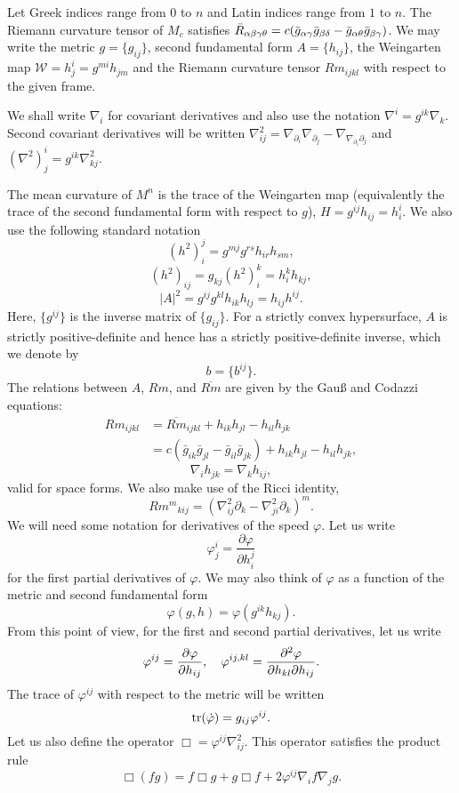 \documentclass{amsart}
\begin{document}
Let Greek indices range from \(0\) to \(n\) and Latin indices range from \(1\) to \(n\). The Riemann curvature tensor of \(M_c\) satisfies \(\bar{R}_{\alpha\beta\gamma\theta} = c(\bar{g}_{\alpha\gamma}\bar{g}_{\beta\delta} - \bar{g}_{\alpha\theta}\bar{g}_{\beta\gamma})\). We may write the metric $g = \{g_{ij}\}$, second fundamental form $A = \{h_{ij}\}$, the Weingarten map $\mathcal{W} = h^i_j = g^{mi} h_{jm}$ and the Riemann curvature tensor $Rm_{ijkl}$ with respect to the given frame.

We shall write \(\nabla_i\) for covariant derivatives and also use the notation \(\nabla^i = g^{ik} \nabla_k\). Second covariant derivatives will be written \(\nabla^2_{ij} = \nabla_{\partial_i} \nabla_{\partial_j} - \nabla_{\nabla_{\partial_i} \partial_j}\) and \((\nabla^2)^i_j = g^{ik} \nabla^2_{kj}\).

The mean curvature of $M^n$ is the trace of the Weingarten map (equivalently the trace of the second fundamental form with respect to $g$), $H = g^{ij}h_{ij} = h^i_i$. We also use the following standard notation
\[
(h^2)_i^j = g^{mj}g^{rs}h_{ir}h_{sm},
\]
\[
(h^2)_{ij} = g_{kj} (h^2)_i^k = h^k_i h_{kj},
\]
\[
|A|^2 = g^{ij}g^{kl}h_{ik}h_{lj} = h_{ij}h^{ij}.
\]
Here, $\{g^{ij}\}$ is the inverse matrix of $\{g_{ij}\}.$ For a strictly convex hypersurface, \(A\) is strictly positive-definite and hence has a strictly positive-definite inverse, which we denote by
\[
b = \{b^{ij}\}.
\]
The relations between $A$, $Rm$, and $\overline{Rm}$ are given by the Gau{\ss} and Codazzi equations:
\[
\begin{split}
Rm_{ijkl} &= \overline{Rm}_{ijkl} + h_{ik}h_{jl} - h_{il}h_{jk} \\
&= c(\bar{g}_{ik}\bar{g}_{jl} - \bar{g}_{il}\bar{g}_{jk}) + h_{ik}h_{jl} - h_{il}h_{jk},
\end{split}
\]
\[
\nabla_i h_{jk} = \nabla_k h_{ij},
\]
valid for space forms. We also make use of the Ricci identity,
\[
{Rm^m}_{kij}  = \left(\nabla^2_{ij} \partial_k - \nabla^2_{ji} \partial_k\right)^m.
\]
We will need some notation for derivatives of the speed \(\varphi\). Let us write
\[
\varphi^{i}_{j} = \frac{\partial \varphi}{\partial h^{j}_{i}}
\]
for the first partial derivatives of \(\varphi\). We may also think of \(\varphi\) as a function of the metric and second fundamental form
\[
\varphi(g, h) = \varphi(g^{ik} h_{kj}).
\]
From this point of view, for the first and second partial derivatives, let us write
\[
\varphi^{ij} = \frac{\partial\varphi}{\partial h_{ij}}, \quad \varphi^{ij,kl} = \frac{\partial^2\varphi}{\partial h_{kl} \partial h_{ij}}.
\]
The trace of \(\varphi^{ij}\) with respect to the metric will be written
\[
\operatorname{tr}(\dot{\varphi}) = g_{ij} \varphi^{ij}.
\]
Let us also define the operator
$
\Box = \varphi^{ij} \nabla^2_{ij}.
$
This operator satisfies the product rule
\begin{equation}
\label{eq:productbox}
\Box (fg) = f \Box g + g \Box f + 2 \varphi^{ij} \nabla_i f \nabla_j g.
\end{equation}
\end{document}
